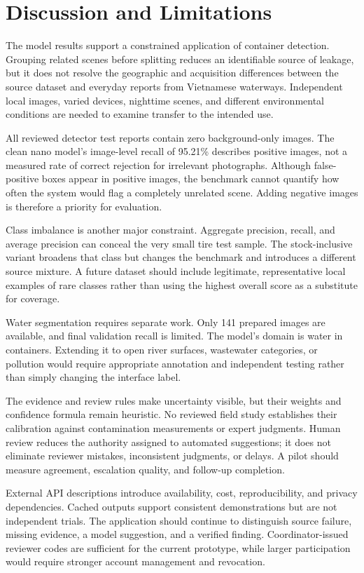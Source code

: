 \documentclass[a4paper,11pt]{article}
\begin{document}
\section{Discussion and Limitations}

The model results support a constrained application of container detection. Grouping related scenes before splitting reduces an identifiable source of leakage, but it does not resolve the geographic and acquisition differences between the source dataset and everyday reports from Vietnamese waterways. Independent local images, varied devices, nighttime scenes, and different environmental conditions are needed to examine transfer to the intended use.

All reviewed detector test reports contain zero background-only images. The clean nano model's image-level recall of 95.21\% describes positive images, not a measured rate of correct rejection for irrelevant photographs. Although false-positive boxes appear in positive images, the benchmark cannot quantify how often the system would flag a completely unrelated scene. Adding negative images is therefore a priority for evaluation.

Class imbalance is another major constraint. Aggregate precision, recall, and average precision can conceal the very small tire test sample. The stock-inclusive variant broadens that class but changes the benchmark and introduces a different source mixture. A future dataset should include legitimate, representative local examples of rare classes rather than using the highest overall score as a substitute for coverage.

Water segmentation requires separate work. Only 141 prepared images are available, and final validation recall is limited. The model's domain is water in containers. Extending it to open river surfaces, wastewater categories, or pollution would require appropriate annotation and independent testing rather than simply changing the interface label.

The evidence and review rules make uncertainty visible, but their weights and confidence formula remain heuristic. No reviewed field study establishes their calibration against contamination measurements or expert judgments. Human review reduces the authority assigned to automated suggestions; it does not eliminate reviewer mistakes, inconsistent judgments, or delays. A pilot should measure agreement, escalation quality, and follow-up completion.

External API descriptions introduce availability, cost, reproducibility, and privacy dependencies. Cached outputs support consistent demonstrations but are not independent trials. The application should continue to distinguish source failure, missing evidence, a model suggestion, and a verified finding. Coordinator-issued reviewer codes are sufficient for the current prototype, while larger participation would require stronger account management and revocation.
\end{document}
